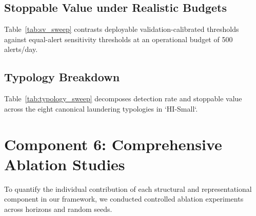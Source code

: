 \documentclass[11pt,a4paper]{article}
\begin{document}
\subsection{Stoppable Value under Realistic Budgets}
Table~\ref{tab:sv_sweep} contrasts deployable validation-calibrated thresholds against equal-alert sensitivity thresholds at an operational budget of 500 alerts/day.

\begin{table}[t]
\centering
\small
\caption{\textbf{Stoppable Value at Alert Budget $B=500$ alerts/day (`HI-Small').}}
\label{tab:sv_sweep}
\resizebox{\textwidth}{!}{%
%
}
\end{table}

\subsection{Typology Breakdown}
Table~\ref{tab:typology_sweep} decomposes detection rate and stoppable value across the eight canonical laundering typologies in `HI-Small`.

\begin{table}[t]
\centering
\small
\caption{\textbf{Typology Decomposition of Detection Rate and Stoppable Value (`HI-Small').}}
\label{tab:typology_sweep}
\resizebox{\textwidth}{!}{%
%
}
\end{table}

\section{Component 6: Comprehensive Ablation Studies}
\label{sec:comp6_ablations}

To quantify the individual contribution of each structural and representational component in our framework, we conducted controlled ablation experiments across horizons and random seeds.
\end{document}

